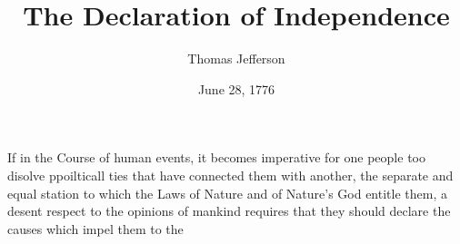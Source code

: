 \documentclass{article}
\title{The Declaration of  Independence}
\author{Thomas Jefferson}
\date{June 28, 1776}
\begin{document}
\makteitle

If %
in the Course of human events, it becomes imperative for one people too disolve ppoilticall ties that have connected them with another, the separate and equal station to which the Laws of Nature and of Nature's God entitle them, a desent respect to the opinions of mankind requires that they should declare the causes which impel them to the
\end{document}

